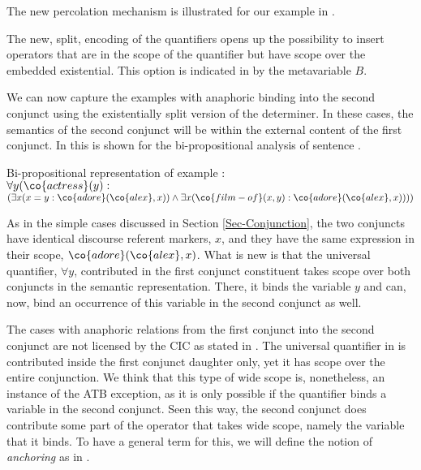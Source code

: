 \documentclass[output=paper]{langsci/langscibook}
\begin{document}
The new percolation mechanism is illustrated for our example in .


\ea \label{ex-dr-princ}
\begin{xlist}
\end{xlist}
\z 


The new, split, encoding of the quantifiers opens up the possibility to insert operators that are in the scope of the quantifier but have scope over the embedded existential. This option is indicated in  by the metavariable $B$.

We can now capture the examples with anaphoric binding into the second conjunct using the existentially split version of the determiner. 
In these cases, the semantics of the second conjunct will be within the external content of the first conjunct. 
In  this is shown for the bi-propositional analysis of sentence . 

\ea \label{bi-every-ana2}
Bi-propositional representation of example :\\[1ex]
$
\forall y (\co{actress}(y) : $\\
\hspace*{3em}$(\exists x (x = y : \co{adore}(\co{alex},x))
\land
\exists x (\co{film-of}(x,y) : \co{adore}(\co{alex},x))
))$
\z 


As in the simple cases discussed in Section \ref{Sec-Conjunction}, the two conjuncts have identical discourse referent markers, $x$, and they have the same expression in  their scope, $\co{adore}(\co{alex},x)$.
What is new is that 
the universal quantifier, $\forall y$, contributed in the first conjunct constituent takes scope over both conjuncts in the semantic representation.
There, it binds the variable $y$ and can, now, bind an occurrence of this variable in the second conjunct as well.

The cases with anaphoric relations from the first conjunct into the second conjunct are not licensed by the CIC as stated in .
The universal quantifier in  is contributed inside the first conjunct daughter only, yet it has scope over the entire conjunction. 
We think that this type of wide scope is, nonetheless, an instance of the ATB exception, as it is only possible if the quantifier binds a variable in the second conjunct. 
Seen this way, the second conjunct does contribute some part of the operator that takes wide scope, namely the variable that it binds. 
To have a general term for this, we will define the notion of \emph{anchoring} as in .
\end{document}
